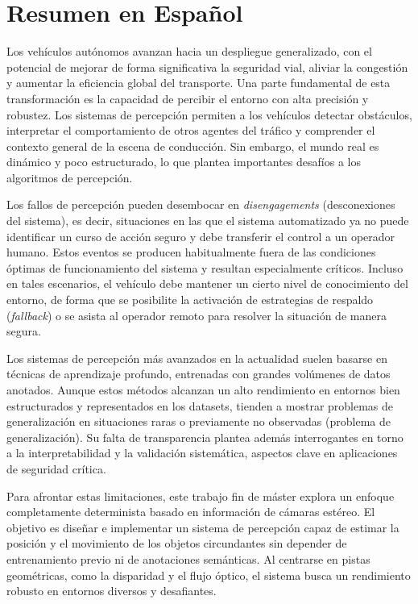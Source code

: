 \chapter{Resumen en Español}\label{chap:ResumenEspanol}



Los vehículos autónomos avanzan hacia un despliegue generalizado, con el
potencial de mejorar de forma significativa la seguridad vial, aliviar la
congestión y aumentar la eficiencia global del transporte. Una parte fundamental
de esta transformación es la capacidad de percibir el entorno con alta precisión y
robustez. Los sistemas de percepción permiten a los vehículos
detectar obstáculos, interpretar el comportamiento de otros agentes del tráfico
y comprender el contexto general de la escena de conducción. Sin embargo, el
mundo real es dinámico y poco estructurado, lo que plantea importantes
desafíos a los algoritmos de percepción.

Los fallos de percepción pueden desembocar en \textit{disengagements} (desconexiones
del sistema), es decir, situaciones en las que el sistema automatizado ya no puede identificar
un curso de acción seguro y debe transferir el control a un operador humano.
Estos eventos se producen habitualmente fuera de las condiciones óptimas de
funcionamiento del sistema y resultan especialmente críticos. Incluso en tales
escenarios, el vehículo debe mantener un cierto nivel de conocimiento del
entorno, de forma que se posibilite la activación de estrategias de respaldo
(\textit{fallback}) o se asista al operador remoto para resolver la situación de
manera segura.

Los sistemas de percepción más avanzados en la actualidad suelen basarse en
técnicas de aprendizaje profundo, entrenadas con grandes volúmenes de datos
anotados. Aunque estos métodos alcanzan un alto rendimiento en entornos bien
estructurados y representados en los datasets, tienden a
mostrar problemas de generalización en situaciones raras o previamente no
observadas (problema de generalización). Su falta de transparencia plantea además interrogantes en torno a
la interpretabilidad y la validación sistemática, aspectos clave en
aplicaciones de seguridad crítica.

Para afrontar estas limitaciones, este trabajo fin de máster explora un enfoque completamente determinista basado en información de cámaras estéreo. El objetivo es diseñar
e implementar un sistema de percepción capaz de estimar la posición y el
movimiento de los objetos circundantes sin depender de entrenamiento previo ni
de anotaciones semánticas. Al centrarse en pistas geométricas, como la
disparidad y el flujo óptico, el sistema busca un rendimiento robusto en
entornos diversos y desafiantes.

